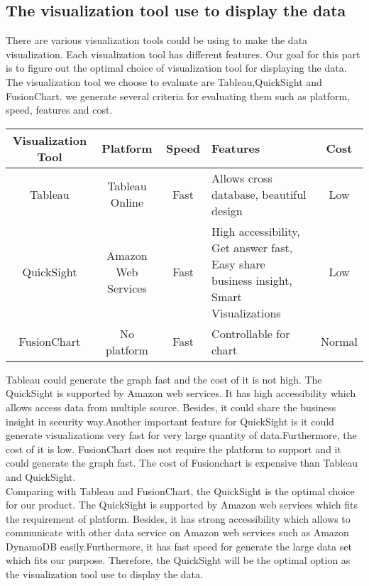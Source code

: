 \documentclass[10pt,draftclsnofoot,onecolumn,journal,compsoc]{IEEEtran}
\begin{document}
        \subsection{The visualization tool use to display the data}
        There are various visualization tools could be using to make the data visualization. Each visualization tool has different features. Our goal for this part is to figure out the optimal choice of visualization tool for displaying the data. The visualization tool we choose to evaluate are Tableau,QuickSight and FusionChart. we generate several criteria for evaluating them such as platform, speed, features and cost.
        
        \begin{table}[ht]
        \centering
        \begin{tabular}{|c|c|c|p{8cm}|c|}
            \hline
            \textbf{Visualization Tool} & \textbf{Platform} & \textbf{Speed} & \textbf{Features} & \textbf{Cost}\\
            \hline
            Tableau & Tableau Online & Fast & Allows cross database, beautiful design & Low\\
            \hline
            QuickSight & Amazon Web Services & Fast & High accessibility, Get answer fast, Easy share business insight, Smart Visualizations & Low\\
            \hline
            FusionChart & No platform & Fast & Controllable for chart & Normal\\
            \hline
        \end{tabular}
        \end{table}
        
        \noindent Tableau could generate the graph fast and the cost of it is not high.  The QuickSight is supported by Amazon web services. It has high accessibility which allows access data from multiple source. Besides, it could share the business insight in security way.Another important feature for QuickSight is it could generate visualizations very fast for very large quantity of data.Furthermore, the cost of it is low\cite{W6}. FusionChart does not require the platform to support and it could generate the graph fast. The cost of Fusionchart is expensive than Tableau and QuickSight.\\


        \noindent Comparing with Tableau and FusionChart, the QuickSight is the optimal choice for our product. The QuickSight is supported by Amazon web services which fits the requirement of platform. Besides, it has strong accessibility which allows to communicate with other data service on Amazon web services such as Amazon DynamoDB easily.Furthermore, it has fast speed for generate the large data set which fits our purpose. Therefore, the QuickSight will be the optimal option as the visualization tool use to display the data.
\end{document}
